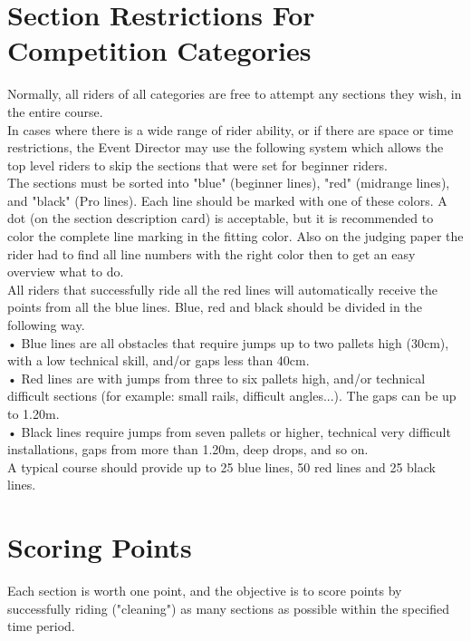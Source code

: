 \section{Section Restrictions For Competition Categories}
Normally, all riders of all categories are free to attempt any sections they wish, in the entire course.\\
In cases where there is a wide range of rider ability, or if there are space or time restrictions, the Event Director may use the following system which allows the top level riders to skip the sections that were set for beginner riders.\\
The sections must be sorted into "blue" (beginner lines), "red" (midrange lines), and "black" (Pro lines). Each line should be marked with one of these colors. A dot (on the section description card) is acceptable, but it is recommended to color the complete line marking in the fitting color. Also on the judging paper the rider had to find all line numbers with the right color then to get an easy overview what to do.\\
All riders that successfully ride all the red lines will automatically receive the points from all the blue lines. Blue, red and black should be divided in the following way.\\
• Blue lines are all obstacles that require jumps up to two pallets high (30cm), with a low technical skill, and/or gaps less than 40cm.\\
• Red lines are with jumps from three to six pallets high, and/or technical difficult sections (for example: small rails, difficult angles...). The gaps can be up to 1.20m.\\
• Black lines require jumps from seven pallets or higher, technical very difficult installations, gaps from more than
1.20m, deep drops, and so on. \\
A typical course should provide up to 25 blue lines, 50 red lines and 25 black lines.
\section{Scoring Points}
Each section is worth one point, and the objective is to score points by successfully riding ("cleaning") as many sections as possible within the specified time period.
